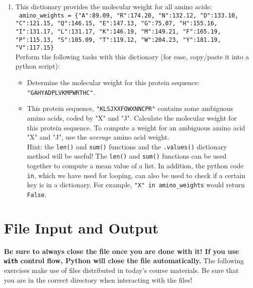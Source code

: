 \documentclass{article}[12pt]
\newcommand{\code}[1]{\texttt{#1}}  %
\begin{document}
\begin{enumerate}
\begin{enumerate}
	\end{enumerate}
	

	\item This dictionary provides the molecular weight for all amino acids: \\ \code{ amino\_weights = \{"A":89.09, "R":174.20, "N":132.12, "D":133.10, "C":121.15, "Q":146.15, "E":147.13, "G":75.07, "H":155.16, "I":131.17, "L":131.17, "K":146.19, "M":149.21, "F":165.19, "P":115.13, "S":105.09, "T":119.12, "W":204.23, "Y":181.19, "V":117.15\}} \\ Perform the following tasks with this dictionary (for ease, copy/paste it into a python script):
	\begin{itemize}
		\item Determine the molecular weight for this protein sequence: \\ \code{"GAHYADPLVKMPWRTHC"}.
		\item This protein sequence, \code{"KLSJXXFOWXNNCPR"} contains some ambiguous amino acids, coded by "X" and "J". Calculate the molecular weight for this protein sequence. To compute a weight for an ambiguous amino acid "X" and "J", use the \emph{average} amino acid weight. \\ Hint: the \code{len()} and \code{sum()} functions and the \code{.values()} dictionary method will be useful! The \code{len()} and \code{sum()} functions can be used together to compute a mean value of a list. In addition, the python code \code{in}, which we have used for looping, can also be used to check if a certain key is in a dictionary. For example, \code{"X" in amino\_weights} would return \code{False}.
		
	\end{itemize}
	
\end{enumerate}



\section{File Input and Output}

\textbf{Be sure to always close the file once you are done with it! If you use \code{with} control flow, Python will close the file automatically.}
The following exercises make use of files distributed in today's course materials. Be sure that you are in the correct directory when interacting with the files!
\end{document}
